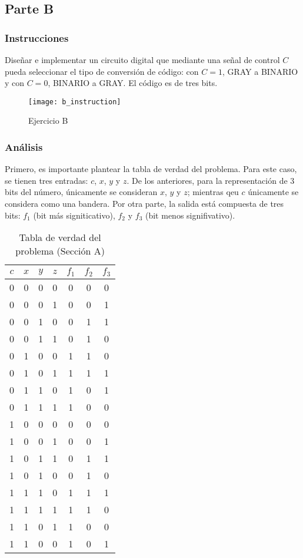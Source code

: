 \documentclass[../procedimientos.tex]{subfiles}
\begin{document}
\clearpage
\subsection{Parte B}
\subsubsection{Instrucciones}
Diseñar e implementar un circuito digital que mediante una señal de control 
$C$ pueda seleccionar el tipo de conversión de código: con $C=1$, GRAY a 
BINARIO y con $C=0$, BINARIO a GRAY. El código es de tres bits.
\begin{figure}[H]
  \centering
  \texttt{[image: b\_instruction]}
  \caption{Ejercicio B}
  \label{fig:b_inst}
\end{figure}

\subsubsection{Análisis}
Primero, es importante plantear la tabla de verdad del problema. Para este 
caso, se tienen  tres entradas: $c$, $x$, $y$ y $z$. De los anteriores, para 
la representación de 3 bits del número, únicamente se consideran $x$, $y$ y 
$z$; mientras qeu $c$ únicamente se considera como una bandera. Por otra 
parte, la salida está compuesta de tres bits: $f_1$ (bit más signiticativo), 
$f_2$ y $f_3$ (bit menos signifivativo).

\begin{table}[H]
  \centering
  \begin{tabular}{cccc|ccc}
    \hline
    $c$ & $x$ & $y$ & $z$ & $f_1$ & $f_2$ & $f_3$\\
    \hline
    0 & 0 & 0 & 0 & 0 & 0 & 0\\
    0 & 0 & 0 & 1 & 0 & 0 & 1\\
    0 & 0 & 1 & 0 & 0 & 1 & 1\\
    0 & 0 & 1 & 1 & 0 & 1 & 0\\
    0 & 1 & 0 & 0 & 1 & 1 & 0\\
    0 & 1 & 0 & 1 & 1 & 1 & 1\\
    0 & 1 & 1 & 0 & 1 & 0 & 1\\
    0 & 1 & 1 & 1 & 1 & 0 & 0\\
    1 & 0 & 0 & 0 & 0 & 0 & 0\\
    1 & 0 & 0 & 1 & 0 & 0 & 1\\
    1 & 0 & 1 & 1 & 0 & 1 & 1\\
    1 & 0 & 1 & 0 & 0 & 1 & 0\\
    1 & 1 & 1 & 0 & 1 & 1 & 1\\
    1 & 1 & 1 & 1 & 1 & 1 & 0\\
    1 & 1 & 0 & 1 & 1 & 0 & 0\\
    1 & 1 & 0 & 0 & 1 & 0 & 1\\
    \hline
  \end{tabular}
  \caption{Tabla de verdad del problema (Sección A)}
  \label{tab:tv_a}
\end{table}
\end{document}
